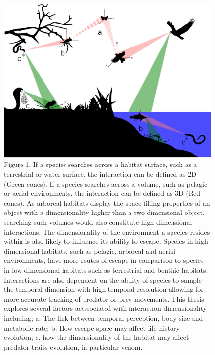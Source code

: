 \begin{figure}[!Hpt]
  \centering
  \includegraphics[keepaspectratio=true, width=1.0\textwidth,left]{ch1-introduction/fig_into.eps}\hspace*{10cm}
  \caption[ ]{Figure 1. If a species searches across a habitat surface, such as a terrestrial or water surface, the interaction can be defined as 2D (Green cones). If a species searches across a volume, such as pelagic or aerial environments, the interaction can be defined as 3D (Red cones). As arboreal habitats display the space filling properties of an object with a dimensionality higher than a two dimensional object, searching such volumes would also constitute high dimensional interactions. The dimensionality of the environment a species resides within is also likely to influence its ability to escape. Species in high dimensional habitats, such as pelagic, arboreal and aerial environments, have more routes of escape in comparison to species in low dimensional habitats such as terrestrial and benthic habitats. Interactions are also dependent on the ability of species to sample the temporal dimension with high temporal resolution allowing for more accurate tracking of predator or prey movements. This thesis explores several factors actssociated with interaction dimensionality including; a. The link between temporal perception, body size and metabolic rate; b. How escape space may affect life-history evolution; c. how the dimensionality of the habitat may affect predator traits evolution, in particular venom.}
  \label{fig:Figure 2.}
\end{figure}


